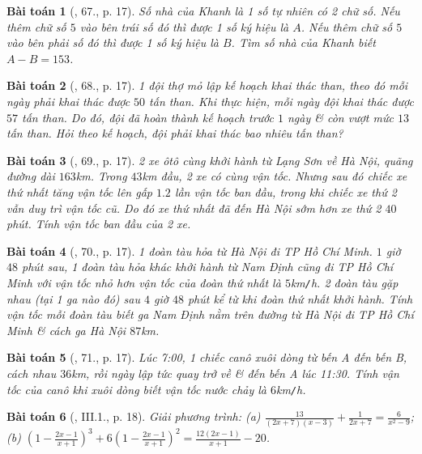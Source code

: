 \documentclass{article}
\newtheorem{baitoan}{Bài toán}
\begin{document}
\begin{baitoan}[\cite{SBT_Toan_8_tap_2}, 67., p. 17]
	Số nhà của Khanh là 1 số tự nhiên có 2 chữ số. Nếu thêm chữ số $5$ vào bên trái số đó thì được 1 số ký hiệu là $A$. Nếu thêm chữ số $5$ vào bên phải số đó thì được 1 số ký hiệu là $B$. Tìm số nhà của Khanh biết $A - B = 153$.
\end{baitoan}

\begin{baitoan}[\cite{SBT_Toan_8_tap_2}, 68., p. 17]
	1 đội thợ mỏ lập kế hoạch khai thác than, theo đó mỗi ngày phải khai thác được $50$ tấn than. Khi thực hiện, mỗi ngày đội khai thác được $57$ tấn than. Do đó, đội đã hoàn thành kế hoạch trước $1$ ngày \& còn vượt mức $13$ tấn than. Hỏi theo kế hoạch, đội phải khai thác bao nhiêu tấn than?
\end{baitoan}

\begin{baitoan}[\cite{SBT_Toan_8_tap_2}, 69., p. 17]
	2 xe ôtô cùng khởi hành từ Lạng Sơn về Hà Nội, quãng đường dài $163$\emph{km}. Trong $43$\emph{km} đầu, 2 xe có cùng vận tốc. Nhưng sau đó chiếc xe thứ nhất tăng vận tốc lên gấp $1.2$ lần vận tốc ban đầu, trong khi chiếc xe thứ 2 vẫn duy trì vận tốc cũ. Do đó xe thứ nhất đã đến Hà Nội sớm hơn xe thứ 2 $40$ phút. Tính vận tốc ban đầu của 2 xe.
\end{baitoan}

\begin{baitoan}[\cite{SBT_Toan_8_tap_2}, 70., p. 17]
	1 đoàn tàu hỏa từ Hà Nội đi TP Hồ Chí Minh. $1$ giờ $48$ phút sau, 1 đoàn tàu hỏa khác khởi hành từ Nam Định cũng đi TP Hồ Chí Minh với vận tốc nhỏ hơn vận tốc của đoàn thứ nhất là $5$\emph{km\texttt{/}h}. 2 đoàn tàu gặp nhau (tại 1 ga nào đó) sau $4$ giờ $48$ phút kể từ khi đoàn thứ nhất khởi hành. Tính vận tốc mỗi đoàn tàu biết ga Nam Định nằm trên đường từ Hà Nội đi TP Hồ Chí Minh \& cách ga Hà Nội $87$\emph{km}.
\end{baitoan}

\begin{baitoan}[\cite{SBT_Toan_8_tap_2}, 71., p. 17]
	Lúc 7:00, 1 chiếc canô xuôi dòng từ bến A đến bến B, cách nhau  $36$\emph{km}, rồi ngày lập tức quay trở về \& đến bến A lúc 11:30. Tính vận tốc của canô khi xuôi dòng biết vận tốc nước chảy là $6$\emph{km\texttt{/}h}.
\end{baitoan}

\begin{baitoan}[\cite{SBT_Toan_8_tap_2}, III.1., p. 18]
	Giải phương trình: (a) $\frac{13}{(2x + 7)(x - 3)} + \frac{1}{2x + 7} = \frac{6}{x^2 - 9}$; (b) $\left(1 - \frac{2x - 1}{x + 1}\right)^3 + 6\left(1 - \frac{2x - 1}{x + 1}\right)^2 = \frac{12(2x - 1)}{x + 1} - 20$.
\end{baitoan}
\end{document}
